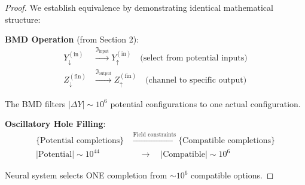 \begin{proof}
We establish equivalence by demonstrating identical mathematical structure:

\textbf{BMD Operation} (from Section 2):
\begin{align}
Y_{\downarrow}^{(\text{in})} &\xrightarrow{\Im_{\text{input}}} Y_{\uparrow}^{(\text{in})} \quad \text{(select from potential inputs)} \\
Z_{\downarrow}^{(\text{fin})} &\xrightarrow{\Im_{\text{output}}} Z_{\uparrow}^{(\text{fin})} \quad \text{(channel to specific output)}
\end{align}

The BMD filters $|\Delta Y| \sim 10^6$ potential configurations to one actual configuration.

\textbf{Oscillatory Hole Filling}:
\begin{align}
\{\text{Potential completions}\} &\xrightarrow{\text{Field constraints}} \{\text{Compatible completions}\} \\
|\text{Potential}| \sim 10^{44} &\quad \to \quad |\text{Compatible}| \sim 10^6
\end{align}

Neural system selects ONE completion from $\sim 10^6$ compatible options.



\end{proof}
